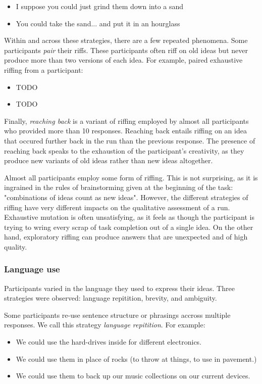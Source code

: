 \begin{itemize}
    \item I suppose you could just grind them down into a sand
    \item You could take the sand... and put it in an hourglass
\end{itemize}

Within and across these strategies, there are a few repeated phenomena.
Some participants \emph{pair} their riffs. These participants  often riff on old ideas but never produce more than two versions of each idea. For example, paired exhaustive riffing from a participant:

\begin{itemize}
\item TODO
\item TODO
\end{itemize}

Finally, \emph{reaching back} is a variant of riffing employed by almost all participants who provided more than 10 responses. Reaching back entails riffing on an idea that occured further back in the run than the previous response. The presence of reaching back speaks to the exhaustion of the participant's creativity, as they produce new variants of old ideas rather than new ideas altogether.

Almost all participants employ some form of riffing. This is not surprising, as it is ingrained in the rules of brainstorming given at the beginning of the task: "combinations of ideas count as new ideas". However, the different strategies of riffing have very different impacts on the qualitative assessment of a run. Exhaustive mutation is often unsatisfying, as it feels as though the participant is trying to wring every scrap of task completion out of a single idea. On the other hand, exploratory riffing can produce answers that are unexpected and of high quality. 

\subsubsection{Language use}

Participants varied in the language they used to express their ideas. Three strategies were observed: language repitition, brevity, and ambiguity.

Some participants re-use sentence structure or phrasings accross multiple responses. We call this strategy \emph{language repitition}. For example:

\begin{itemize}
    \item We could use the hard-drives inside for different electronics.
    \item We could use them in place of rocks (to throw at things, to use in pavement.)
    \item We could use them to back up our music collections on our current devices.
\end{itemize}

